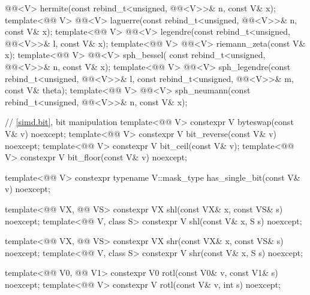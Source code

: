 \begin{codeblock}
{    @@<V> hermite(const rebind_t<unsigned, @@<V>>& n, const V& x);
  template<@@ V>
    @@<V> laguerre(const rebind_t<unsigned, @@<V>>& n, const V& x);
  template<@@ V>
    @@<V> legendre(const rebind_t<unsigned, @@<V>>& l, const V& x);
  template<@@ V>
    @@<V> riemann_zeta(const V& x);
  template<@@ V>
    @@<V> sph_bessel(
      const rebind_t<unsigned, @@<V>>& n, const V& x);
  template<@@ V>
    @@<V> sph_legendre(const rebind_t<unsigned, @@<V>>& l,
      const rebind_t<unsigned, @@<V>>& m, const V& theta);
  template<@@ V>
    @@<V>
      sph_neumann(const rebind_t<unsigned, @@<V>>& n, const V& x);

  // \ref{simd.bit}, bit manipulation
  template<@@ V> constexpr V byteswap(const V& v) noexcept;
  template<@@ V> constexpr V bit_reverse(const V& v) noexcept;
  template<@@ V> constexpr V bit_ceil(const V& v);
  template<@@ V> constexpr V bit_floor(const V& v) noexcept;

  template<@@ V>
    constexpr typename V::mask_type has_single_bit(const V& v) noexcept;

  template<@@ VX, @@ VS>
    constexpr VX shl(const VX& x, const VS& s) noexcept;
  template<@@ V, class S>
    constexpr V  shl(const V& x, S s) noexcept;

  template<@@ VX, @@ VS>
    constexpr VX shr(const VX& x, const VS& s) noexcept;
  template<@@ V, class S>
    constexpr V  shr(const V& x, S s) noexcept;

  template<@@ V0, @@ V1>
    constexpr V0 rotl(const V0& v, const V1& s) noexcept;
  template<@@ V>
    constexpr V  rotl(const V& v, int s) noexcept;

}
\end{codeblock}
